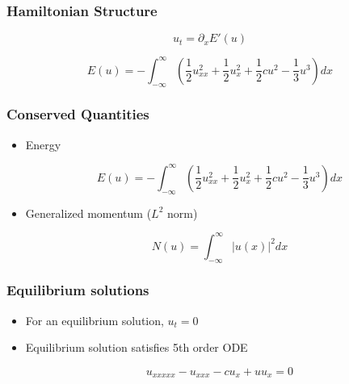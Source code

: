 \documentclass[16pt]{beamer}
\begin{document}
\begin{frame}
	\frametitle{Hamiltonian Structure}
	\fontsize{16}{7.2}\selectfont
		\begin{center}
		\[ u_t = \partial_x E'(u) \]
		\end{center}

		\begin{center}
		\[ E(u) = -\int_{-\infty}^{\infty} \left( \frac{1}{2}u_{xx}^2 + \frac{1}{2}u_x^2 + \frac{1}{2}cu^2 - \frac{1}{3}u^3 \right) dx \]
		\end{center}
\end{frame}

\begin{frame}
	\frametitle{Conserved Quantities}
	\fontsize{16}{7.2}\selectfont
	\begin{itemize}
		\item Energy
		\begin{center}
		\[ E(u) = -\int_{-\infty}^{\infty} \left( \frac{1}{2}u_{xx}^2 + \frac{1}{2}u_x^2 + \frac{1}{2}cu^2 - \frac{1}{3}u^3 \right) dx \]
		\end{center}

		\item Generalized momentum ($L^2$ norm)

		\begin{center}
		\[ N(u) = \int_{-\infty}^\infty |u(x)|^2 dx \]
		\end{center}
	\end{itemize}
\end{frame}

\begin{frame}
	\frametitle{Equilibrium solutions}
	\fontsize{18}{7.2}\selectfont
	\begin{itemize}
		\item<1-> For an equilibrium solution, $u_t = 0$

		\vspace{0.5cm}
		\item<2-> Equilibrium solution satisfies 5th order ODE 
		\begin{center}
		\[ u_{xxxxx} - u_{xxx} - c u_x + u u_x = 0 \]
		\end{center}
	\end{itemize}
\end{frame}
\end{document}
